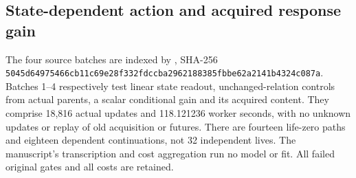 \subsection*{State-dependent action and acquired response gain}
The four source batches are indexed by , SHA-256 \texttt{5045d649\allowbreak{}75466cb1\allowbreak{}1c69e28f\allowbreak{}332fdccb\allowbreak{}a2962188\allowbreak{}385fbbe6\allowbreak{}2a2141b4\allowbreak{}324c087a}. Batches 1--4 respectively test linear state readout, unchanged-relation controls from actual parents, a scalar conditional gain and its acquired content. They comprise 18,816 actual updates and 118.121236 worker seconds, with no unknown updates or replay of old acquisition or futures. There are fourteen life-zero paths and eighteen dependent continuations, not 32 independent lives. The manuscript's transcription and cost aggregation run no model or fit. All failed original gates and all costs are retained.
\begingroup\scriptsize\setlength{\tabcolsep}{3pt}\setlength{\LTpre}{6pt}\setlength{\LTpost}{6pt}

